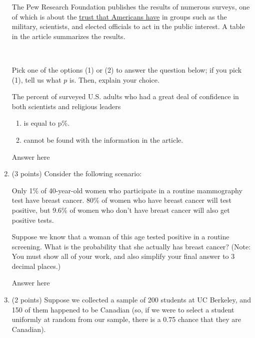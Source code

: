 \documentclass[11pt]{article}
\begin{document}
\begin{enumerate}
        The Pew Research Foundation publishes the results of numerous surveys, one of which
        is about the \href{https://www.pewresearch.org/fact-tank/2019/03/22/public-confidence-in-scientists-has-remained-stable-for-decades/}{trust that Americans have} in groups such as the military, scientists, and elected officials to act in the public interest. A table in the article summarizes the results.
        
        \ 
        
        Pick one of the options (1) or (2) to answer the question below; if you pick (1), tell us
        what $p$ is. Then, explain your choice.
        
        The percent of surveyed U.S. adults who had a great deal of confidence in both scientists
        and religious leaders
        \begin{enumerate}[1.]
            \item is equal to p\%. %
            \item cannot be found with the information in the article.
        \end{enumerate}
        \begin{Answer}
            Answer here
        \end{Answer}
   \newpage
   
   
           \item (3 points) Consider the following scenario:
           
            Only 1\% of 40-year-old women who participate in a routine mammography test have breast cancer. 80\% of women who have breast cancer will test positive, but 9.6\% of women who don’t have breast cancer will also get positive tests.
            
            Suppose we know that a woman of this age tested positive in a routine screening. What is the probability that she actually has breast cancer? (Note: You must show all of your work, and also simplify your final answer to 3 decimal places.)
            \begin{Answer}
                Answer here
            \end{Answer}
    \newpage
        
        
            \item (2 points) Suppose we collected a sample of 200 students at UC Berkeley, and 150 of them happened to be Canadian (so, if we were to select a student uniformly at random from our sample, there is a 0.75 chance that they are Canadian).
            

\end{enumerate}
\end{document}
